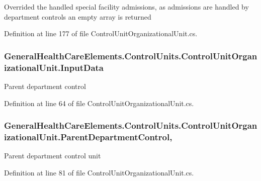 Overrided the handled special facility admissions, as admissions are handled by department controls an empty array is returned 



Definition at line 177 of file Control\+Unit\+Organizational\+Unit.\+cs.

\subsubsection[{\texorpdfstring{Input\+Data}{InputData}}]{ General\+Health\+Care\+Elements.\+Control\+Units.\+Control\+Unit\+Organizational\+Unit.\+Input\+Data\hspace{0.3cm}{\ttfamily [get]}}\hypertarget{class_general_health_care_elements_1_1_control_units_1_1_control_unit_organizational_unit_a50637ef02290149a07378cbe89c369fe}{}\label{class_general_health_care_elements_1_1_control_units_1_1_control_unit_organizational_unit_a50637ef02290149a07378cbe89c369fe}


Parent department control 



Definition at line 64 of file Control\+Unit\+Organizational\+Unit.\+cs.

\subsubsection[{\texorpdfstring{Parent\+Department\+Control}{ParentDepartmentControl}}]{ General\+Health\+Care\+Elements.\+Control\+Units.\+Control\+Unit\+Organizational\+Unit.\+Parent\+Department\+Control\hspace{0.3cm}{\ttfamily [get]}, {\ttfamily [set]}}\hypertarget{class_general_health_care_elements_1_1_control_units_1_1_control_unit_organizational_unit_afa29f4d91214c9c7421ed71307a0b792}{}\label{class_general_health_care_elements_1_1_control_units_1_1_control_unit_organizational_unit_afa29f4d91214c9c7421ed71307a0b792}


Parent department control unit 



Definition at line 81 of file Control\+Unit\+Organizational\+Unit.\+cs.

